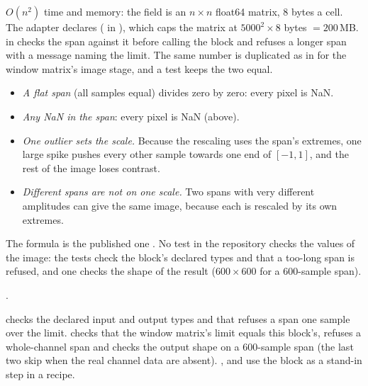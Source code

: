 $O(n^2)$ time and memory: the field is an $n \times n$ float64 matrix, 8 bytes a cell. The
adapter declares  ( in
), which caps the matrix at $5000^2 \times 8$ bytes
$= 200$\,MB.  in  checks the span against it
before calling the block and refuses a longer span with a message naming the limit. The
same number is duplicated as  in  for the
window matrix's image stage, and a test keeps the two equal.

\begin{itemize}
\item \emph{A flat span} (all samples equal) divides zero by zero: every pixel is NaN.
\item \emph{Any NaN in the span}: every pixel is NaN (above).
\item \emph{One outlier sets the scale.} Because the rescaling uses the span's extremes, one
  large spike pushes every other sample towards one end of $[-1,1]$, and the rest of the
  image loses contrast.
\item \emph{Different spans are not on one scale.} Two spans with very different amplitudes
  can give the same image, because each is rescaled by its own extremes.
\end{itemize}

The formula is the published one \citep{wang2015imaging}. No test in the repository checks
the values of the image: the tests check the block's declared types and that a too-long span
is refused, and one checks the shape of the result ($600 \times 600$ for a 600-sample span).

\citet{wang2015imaging}.

 checks the declared input and output types and that
 refuses a span one sample over the limit.
 checks that the window matrix's limit equals this
block's, refuses a whole-channel span and checks the output shape on a 600-sample span (the
last two skip when the real channel data are absent). ,
 and  use the block as a
stand-in step in a recipe.
